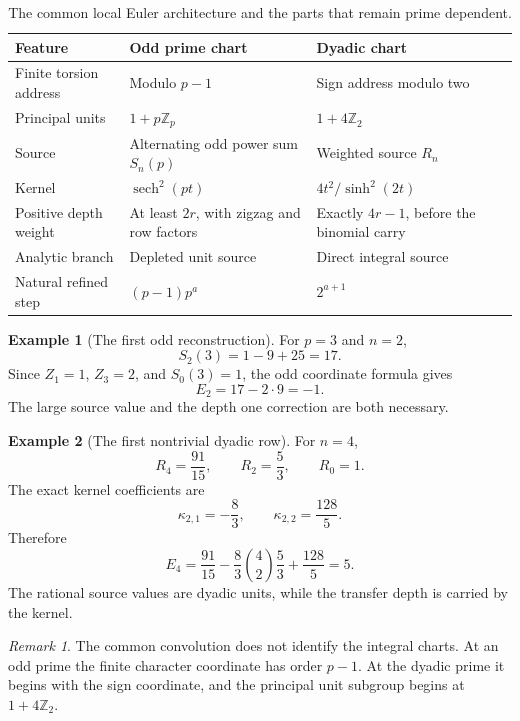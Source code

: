 \documentclass{aomart}
\theoremstyle{definition}
\newtheorem{example}[example]{Example}
\theoremstyle{remark}
\newtheorem{remark}[remark]{Remark}
\begin{document}
\begin{table}[t]
\centering
\caption{The common local Euler architecture and the parts that remain prime dependent.}
\label{tab:local_chart_comparison}
\begin{tabular}{>{\raggedright\arraybackslash}p{}>{\raggedright\arraybackslash}p{}>{\raggedright\arraybackslash}p{}}
\toprule
Feature & Odd prime chart & Dyadic chart\\
\midrule
Finite torsion address & Modulo \(p-1\) & Sign address modulo two\\
Principal units & \(1+p\mathbb Z_p\) & \(1+4\mathbb Z_2\)\\
Source & Alternating odd power sum \(S_n(p)\) & Weighted source \(R_n\)\\
Kernel & \(\operatorname{sech}^2(pt)\) & \(4t^2/\sinh^2(2t)\)\\
Positive depth weight & At least \(2r\), with zigzag and row factors & Exactly \(4r-1\), before the binomial carry\\
Analytic branch & Depleted unit source & Direct integral source\\
Natural refined step & \((p-1)p^a\) & \(2^{a+1}\)\\
\bottomrule
\end{tabular}
\end{table}

\begin{example}[The first odd reconstruction]\label{ex:first_odd_reconstruction}
For \(p=3\) and \(n=2\),
\[
S_2(3)=1-9+25=17.
\]
Since \(Z_1=1\), \(Z_3=2\), and \(S_0(3)=1\), the odd coordinate formula gives
\[
E_2
=17-2\cdot9
=-1.
\]
The large source value and the depth one correction are both necessary.
\end{example}

\begin{example}[The first nontrivial dyadic row]\label{ex:first_dyadic_reconstruction}
For \(n=4\),
\[
R_4=\frac{91}{15},
\qquad
R_2=\frac53,
\qquad
R_0=1.
\]
The exact kernel coefficients are
\[
\kappa_{2,1}=-\frac83,
\qquad
\kappa_{2,2}=\frac{128}{5}.
\]
Therefore
\[
E_4
=
\frac{91}{15}
-\frac83\binom42\frac53
+\frac{128}{5}
=5.
\]
The rational source values are dyadic units, while the transfer depth is carried by the kernel.
\end{example}

\begin{remark}\label{rem:no_dyadic_substitution}
The common convolution does not identify the integral charts. At an odd prime the finite character coordinate has order \(p-1\). At the dyadic prime it begins with the sign coordinate, and the principal unit subgroup begins at \(1+4\mathbb Z_2\).
\end{remark}
\end{document}
